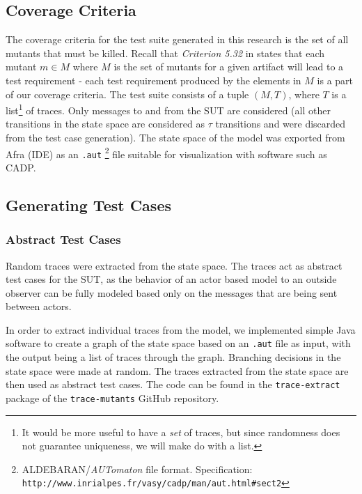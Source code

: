 \documentclass{article}
\begin{document}
		\subsection{Coverage Criteria}
			\label{sec:coveragecrit}
			The coverage criteria for the test suite generated in this research is the set of all mutants that must be killed. Recall that \textit{Criterion 5.32} in \citet{ammann2008introduction} states that each mutant $m \in M$ where $M$ is the set of mutants for a given artifact will lead to a test requirement \-- each test requirement produced by the elements in $M$ is a part of our coverage criteria.
			The test suite consists of a tuple $(M, T)$, where $T$ is a list\footnote{It would be more useful to have a \textit{set} of traces, but since randomness does not guarantee uniqueness, we will make do with a list.} of traces. Only messages to and from the SUT are considered (all other transitions in the state space are considered as $\tau$ transitions and were discarded from the test case generation). The state space of the model was exported from Afra (\Rebeca IDE) as an \texttt{.aut}
			\footnote{ALDEBARAN/\textit{AUTomaton} file format. Specification: \texttt{http://www.inrialpes.fr/vasy/cadp/man/aut.html\#sect2}} file suitable for visualization with software such as CADP.

		\subsection{Generating Test Cases}
			\label{sec:method_testgen}
			\subsubsection{Abstract Test Cases}
				\label{sec:method_abstract}
				Random traces were extracted from the state space. The traces act as abstract test cases for the SUT, as the behavior of an actor based model to an outside observer can be fully modeled based only on the messages that are being sent between actors.

				In order to extract individual traces from the \Rebeca model, we implemented simple Java software to create a graph of the state space based on an \texttt{.aut} file as input, with the output being a list of traces through the graph. Branching decisions in the state space were made at random. The traces extracted from the state space are then used as abstract test cases.
				The code can be found in the \texttt{trace-extract} package of the \texttt{trace-mutants} GitHub repository. \nocite{trace-mutants}
\end{document}
